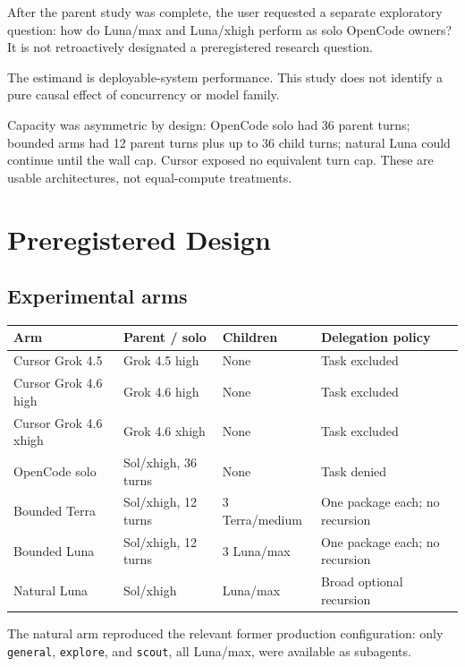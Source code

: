 \documentclass[11pt,oneside]{article}
\begin{document}
After the parent study was complete, the user requested a separate exploratory
question: how do Luna/max and Luna/xhigh perform as solo OpenCode owners? It is
not retroactively designated a preregistered research question.

The estimand is deployable-system performance. This study does not identify a
pure causal effect of concurrency or model family.

Capacity was asymmetric by design: OpenCode solo had 36 parent turns; bounded
arms had 12 parent turns plus up to 36 child turns; natural Luna could continue
until the wall cap. Cursor exposed no equivalent turn cap. These are usable
architectures, not equal-compute treatments.

\section{Preregistered Design}

\subsection{Experimental arms}

\begin{center}
\small
\begin{tabularx}{\textwidth}{@{}XllX@{}}
\toprule
Arm & Parent / solo & Children & Delegation policy \\
\midrule
Cursor Grok 4.5 & Grok 4.5 high & None & Task excluded \\
Cursor Grok 4.6 high & Grok 4.6 high & None & Task excluded \\
Cursor Grok 4.6 xhigh & Grok 4.6 xhigh & None & Task excluded \\
OpenCode solo & Sol/xhigh, 36 turns & None & Task denied \\
Bounded Terra & Sol/xhigh, 12 turns & 3 Terra/medium & One package each; no recursion \\
Bounded Luna & Sol/xhigh, 12 turns & 3 Luna/max & One package each; no recursion \\
Natural Luna & Sol/xhigh & Luna/max & Broad optional recursion \\
\bottomrule
\end{tabularx}
\end{center}

The natural arm reproduced the relevant former production configuration: only
\texttt{general}, \texttt{explore}, and \texttt{scout}, all Luna/max, were
available as subagents.
\end{document}
